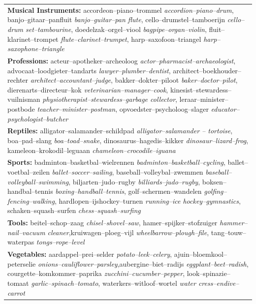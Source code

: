 \documentclass[doc]{apa6}
\begin{document}
\begin{appendix}
\begin{small}
\begin{longtable}{p{14cm}}
\textbf{Musical Instruments:} accordeon--piano--trommel \textit{accordion--piano--drum}, banjo--gitaar--panfluit \textit{ banjo--guitar--pan flute}, cello--drumstel--tamboerijn \textit{cello--drum set--tambourine}, doedelzak--orgel--viool \textit{ bagpipe--organ--violin}, fluit--klarinet--trompet \textit{flute--clarinet--trumpet}, harp--saxofoon--triangel \textit{ harp--saxophone--triangle}
\smallskip \\

\textbf{Professions:} acteur--apotheker--archeoloog \textit{actor--pharmacist--archaeologist}, advocaat--loodgieter--tandarts \textit{ lawyer--plumber--dentist}, architect--boekhouder--rechter \textit{architect--accountant--judge}, bakker--dokter--piloot \textit{ baker--doctor--pilot}, dierenarts--directeur--kok \textit{veterinarian--manager--cook}, kinesist--stewardess--vuilnisman \textit{ physiotherapist--stewardess--garbage collector}, leraar--minister--postbode \textit{teacher--minister--postman}, opvoedster--psycholoog--slager \textit{ educator--psychologist--butcher}
\smallskip \\

\textbf{Reptiles:} alligator--salamander--schildpad \textit{alligator--salamander -- tortoise}, boa--pad--slang \textit{ boa--toad--snake}, dinosaurus--hagedis--kikker \textit{dinosaur--lizard--frog}, kameleon--krokodil--leguaan \textit{ chameleon--crocodile--iguana}
\smallskip \\

\textbf{Sports:} badminton--basketbal--wielrennen \textit{badminton--basketball--cycling}, ballet--voetbal--zeilen \textit{ ballet--soccer--sailing}, baseball--volleybal--zwemmen \textit{baseball--volleyball--swimming}, biljarten--judo--rugby \textit{ billiards--judo--rugby}, boksen--handbal--tennis \textit{boxing--handball--tennis}, golf--schermen--wandelen \textit{ golfing--fencing--walking}, hardlopen--ijshockey--turnen \textit{running--ice hockey--gymnastics}, schaken--squash--surfen \textit{ chess--squash--surfing}
\smallskip \\

\textbf{Tools:} beitel--schop--zaag \textit{chisel--shovel--saw}, hamer--spijker--stofzuiger \textit{ hammer--nail--vacuum cleaner},kruiwagen--ploeg--vijl \textit{wheelbarrow--plough--file}, tang--touw--waterpas \textit{ tongs--rope--level}
\smallskip \\

\textbf{Vegetables:} aardappel--prei--selder \textit{potato--leek--celery}, ajuin--bloemkool--peterselie \textit{ onions--cauliflower--parsley},aubergine--biet--radijs \textit{eggplant--beet--radish}, courgette--komkommer--paprika \textit{ zucchini--cucumber--pepper}, look--spinazie--tomaat \textit{garlic--spinach--tomato}, waterkers--witloof--wortel \textit{ water cress--endive--carrot}
\smallskip \\


\end{longtable}
\end{small}
\end{appendix}
\end{document}
